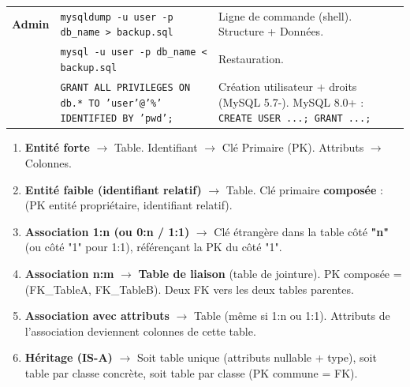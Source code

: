 \documentclass[11pt]{article}
\newcounter{popsec}
\newcounter{popsub}
\newcommand{\courssub}[1]{%
  \stepcounter{popsub}%
  \par\vspace{9pt}\noindent{\popxbold\fontsize{11.5}{13}\selectfont\color{popink}{\color{poporange}\thepopsec.\thepopsub}\hspace{6pt}#1}\par\nopagebreak\vspace{4pt}
}
\begin{document}
\begin{bilan}
\begin{center}
\begin{tabularx}{\linewidth}{|>{\bfseries}l|X|X|}
\hline
\textbf{Admin} & \texttt{mysqldump -u user -p db\_name > backup.sql} & Ligne de commande (shell). Structure + Données. \\
& \texttt{mysql -u user -p db\_name < backup.sql} & Restauration. \\
& \texttt{GRANT ALL PRIVILEGES ON db.* TO 'user'@'\%' IDENTIFIED BY 'pwd';} & Création utilisateur + droits (MySQL 5.7-). MySQL 8.0+ : \texttt{CREATE USER ...; GRANT ...;} \\
\hline
\end{tabularx}
\end{center}

\courssub{Méthodes Express}

\begin{methode}
\begin{enumerate}
\item \textbf{Entité forte} $\to$ Table. Identifiant $\to$ Clé Primaire (PK). Attributs $\to$ Colonnes.
\item \textbf{Entité faible (identifiant relatif)} $\to$ Table. Clé primaire \textbf{composée} : (PK entité propriétaire, identifiant relatif).
\item \textbf{Association 1:n (ou 0:n / 1:1)} $\to$ Clé étrangère dans la table côté \textbf{"n"} (ou côté "1" pour 1:1), référençant la PK du côté "1".
\item \textbf{Association n:m} $\to$ \textbf{Table de liaison} (table de jointure). PK composée = (FK\_TableA, FK\_TableB). Deux FK vers les deux tables parentes.
\item \textbf{Association avec attributs} $\to$ Table (même si 1:n ou 1:1). Attributs de l'association deviennent colonnes de cette table.
\item \textbf{Héritage (IS-A)} $\to$ Soit table unique (attributs nullable + type), soit table par classe concrète, soit table par classe (PK commune = FK).
\end{enumerate}
\end{methode}


\end{bilan}
\end{document}
